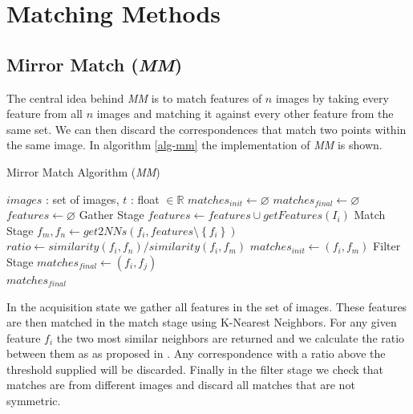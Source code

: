 \documentclass[conference]{IEEEtran}
\begin{document}
\section{Matching Methods}
\subsection{Mirror Match (\emph{MM})}
%
The central idea behind \emph{MM} is to match features of $n$ images by 
taking every feature from all $n$ images and matching it against every 
other feature from the same set. We can then discard the correspondences 
that match two points within the same image. In algorithm \ref{alg-mm} 
the implementation of \emph{MM} is shown.
%
\begin{algorithm}
\caption{Mirror Match Algorithm (\emph{MM})}
\label{alg-mm}
{\fontsize{10}{10}\selectfont
\begin{algorithmic}
\Require $images$ : set of images, $t$ : float $\in \mathbb{R}$
\State $matches_{init}\gets \varnothing$
\State $matches_{final}\gets \varnothing$
\State $features\gets \varnothing$
 \Comment Gather Stage
	\State $features\gets features \cup getFeatures(I_i)$
\EndFor
{} \Comment Match Stage
	\State $f_m,f_n \gets get2NNs(f_i, features \setminus 
	\left\{f_i\right\})$
	\State $ratio \gets similarity(f_i, f_n) / similarity(f_i, f_m)$
		\State $matches_{init} \gets \left(f_i, f_m\right)$
	\EndIf
\EndFor
{} \Comment Filter 
Stage
		\State $matches_{final} \gets (f_i, f_j)$
	\EndIf
\EndFor \\
\Return $matches_{final}$
\end{algorithmic}
}
\end{algorithm}
%
In the acquisition state we gather all features in the set of images.  
These features are then matched in the match stage using K-Nearest 
Neighbors.  For any given feature $f_i$ the two most similar neighbors 
are returned and we calculate the ratio between them as as proposed in 
\cite{lowe2004sift}.  Any correspondence with a ratio above the 
threshold supplied will be discarded. Finally in the filter stage we 
check that matches are from different images and discard all matches 
that are not symmetric.
%
\end{document}
